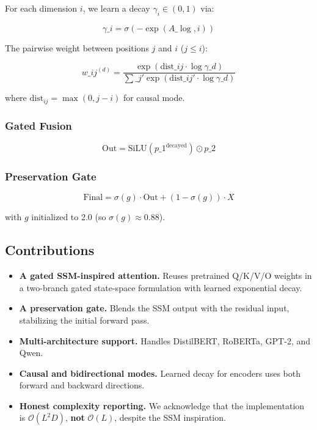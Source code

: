 For each dimension $i$, we learn a decay $\gamma_i \in (0, 1)$ via:

\[
\gamma\_i = \sigma(-\exp(A\_{\log, i}))
\tag{1.2}
\]

The pairwise weight between positions $j$ and $i$ ($j \leq i$):

\[
w\_{ij}^{(d)} = \frac{\exp(\text{dist}\_{ij} \cdot \log \gamma\_d)}{\sum\_{j'} \exp(\text{dist}\_{ij'} \cdot \log \gamma\_d)}
\tag{1.3}
\]

where $\text{dist}_{ij} = \max(0, j - i)$ for causal mode.

\subsubsection{Gated Fusion}

\[
\text{Out} = \text{SiLU}(p\_1^\text{decayed}) \odot p\_2
\tag{1.4}
\]

\subsubsection{Preservation Gate}

\[
\text{Final} = \sigma(g) \cdot \text{Out} + (1 - \sigma(g)) \cdot X
\tag{1.5}
\]

with $g$ initialized to 2.0 (so $\sigma(g) \approx 0.88$).

\subsection{Contributions}

\begin{itemize}
\item \textbf{A gated SSM-inspired attention.} Reuses pretrained Q/K/V/O weights in a
  two-branch gated state-space formulation with learned exponential decay.
\item \textbf{A preservation gate.} Blends the SSM output with the residual input,
  stabilizing the initial forward pass.
\item \textbf{Multi-architecture support.} Handles DistilBERT, RoBERTa, GPT-2, and
  Qwen.
\item \textbf{Causal and bidirectional modes.} Learned decay for encoders uses both
  forward and backward directions.
\item \textbf{Honest complexity reporting.} We acknowledge that the implementation is
  $\mathcal{O}(L^2 D)$, \textbf{not} $\mathcal{O}(L)$, despite the SSM inspiration.

\end{itemize}
